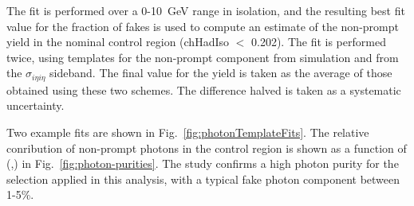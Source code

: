 The fit is performed over a 0-10~GeV range in isolation, and the
resulting best fit value for the fraction of fakes is used to compute
an estimate of the non-prompt yield in the nominal \gj control region
(chHadIso $<$ 0.202). The fit is performed twice, using templates for
the non-prompt component from simulation and from the $\sigma_{i\eta
i\eta}$ sideband. The final value for the yield is taken as the
average of those obtained using these two schemes. The difference
halved is taken as a systematic uncertainty.

Two example fits are shown in Fig.~\ref{fig:photonTemplateFits}. The
relative conribution of non-prompt photons in the \gj control region 
is shown as a function of (\njet,\HT) in Fig.~\ref{fig:photon-purities}.
The study confirms a high photon purity for the selection applied
in this analysis, with a typical fake photon component between 1-5\%.


